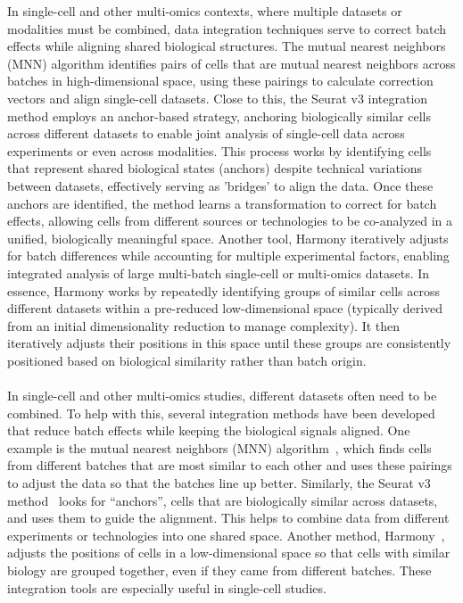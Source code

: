 \documentclass[12pt,a4paper]{report}
\begin{document}
In single-cell and other multi-omics contexts, where multiple datasets or modalities must be combined, data integration techniques serve to correct batch effects while aligning shared biological structures. The mutual nearest neighbors (MNN) algorithm \cite{haghverdi2018mnn} identifies pairs of cells that are mutual nearest neighbors across batches in high-dimensional space, using these pairings to calculate correction vectors and align single-cell datasets. Close to this, the Seurat v3 \cite{stuart2019seurat} integration method employs an anchor-based strategy, anchoring biologically similar cells across different datasets to enable joint analysis of single-cell data across experiments or even across modalities. This process works by identifying cells that represent shared biological states (anchors) despite technical variations between datasets, effectively serving as 'bridges' to align the data. Once these anchors are identified, the method learns a transformation to correct for batch effects, allowing cells from different sources or technologies to be co-analyzed in a unified, biologically meaningful space. Another tool, Harmony \cite{korsunsky2019harmony} iteratively adjusts for batch differences while accounting for multiple experimental factors, enabling integrated analysis of large multi-batch single-cell or multi-omics datasets. In essence, Harmony works by repeatedly identifying groups of similar cells across different datasets within a pre-reduced low-dimensional space (typically derived from an initial dimensionality reduction to manage complexity). It then iteratively adjusts their positions in this space until these groups are consistently positioned based on biological similarity rather than batch origin.\\
\\
In single-cell and other multi-omics studies, different datasets often need to be combined. To help with this, several integration methods have been developed that reduce batch effects while keeping the biological signals aligned. One example is the mutual nearest neighbors (MNN) algorithm~\cite{haghverdi2018mnn}, which finds cells from different batches that are most similar to each other and uses these pairings to adjust the data so that the batches line up better. Similarly, the Seurat v3 method~\cite{stuart2019seurat} looks for “anchors”, cells that are biologically similar across datasets, and uses them to guide the alignment. This helps to combine data from different experiments or technologies into one shared space. Another method, Harmony~\cite{korsunsky2019harmony}, adjusts the positions of cells in a low-dimensional space so that cells with similar biology are grouped together, even if they came from different batches. These integration tools are especially useful in single-cell studies.\\
\end{document}
